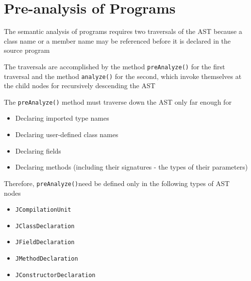 \documentclass[8pt,a4paper,compress]{beamer}
\begin{document}
\section{Pre-analysis of \protect\jmm Programs}
\begin{frame}[fragile]
\pause

The semantic analysis of \jmm  programs requires two traversals of the AST because a class name or a member name may be referenced before it is declared in the source program

\pause
\bigskip

The traversals are accomplished by the method \lstinline{preAnalyze()} for the first traversal and the method \lstinline{analyze()} for the second, which invoke themselves at the child nodes for recursively descending the AST

\pause
\bigskip

The \lstinline{preAnalyze()} method must traverse down the AST only far enough for
\begin{itemize}
\pause
\item Declaring imported type names
\pause
\item Declaring user-defined class names
\pause
\item Declaring fields
\pause
\item Declaring methods (including their signatures - the types of their parameters)
\end{itemize}

\pause
\bigskip

Therefore, \lstinline{preAnalyze()}need be defined only in the following types of AST nodes
\begin{itemize}
\pause
\item \lstinline{JCompilationUnit}
\pause
\item \lstinline{JClassDeclaration}
\pause
\item \lstinline{JFieldDeclaration}
\pause
\item \lstinline{JMethodDeclaration}
\pause
\item \lstinline{JConstructorDeclaration}
\end{itemize}
\end{frame}
\end{document}

